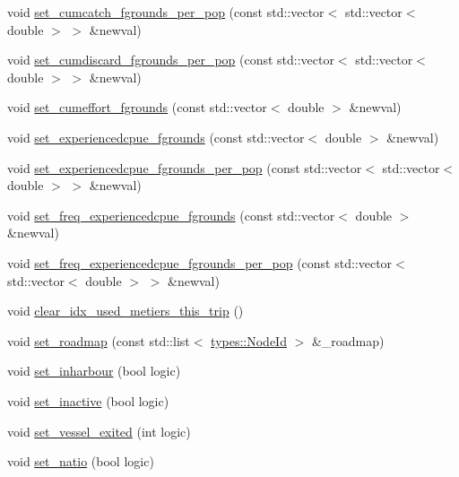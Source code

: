 \begin{DoxyCompactItemize}
\item 
void \mbox{\hyperlink{class_vessel_a8b44f8261d1ca80cc5e86603cd52852a}{set\+\_\+cumcatch\+\_\+fgrounds\+\_\+per\+\_\+pop}} (const std\+::vector$<$ std\+::vector$<$ double $>$ $>$ \&newval)
\item 
void \mbox{\hyperlink{class_vessel_ac49a748160127f353d2cd22e5eb75c2e}{set\+\_\+cumdiscard\+\_\+fgrounds\+\_\+per\+\_\+pop}} (const std\+::vector$<$ std\+::vector$<$ double $>$ $>$ \&newval)
\item 
void \mbox{\hyperlink{class_vessel_af4f1e3170ec6f71aeed23aac07110d65}{set\+\_\+cumeffort\+\_\+fgrounds}} (const std\+::vector$<$ double $>$ \&newval)
\item 
void \mbox{\hyperlink{class_vessel_afa0bdfa0b54d6a9c5e453306a3824230}{set\+\_\+experiencedcpue\+\_\+fgrounds}} (const std\+::vector$<$ double $>$ \&newval)
\item 
void \mbox{\hyperlink{class_vessel_a2fc858f82e610f2b4b4852001ad0c58c}{set\+\_\+experiencedcpue\+\_\+fgrounds\+\_\+per\+\_\+pop}} (const std\+::vector$<$ std\+::vector$<$ double $>$ $>$ \&newval)
\item 
void \mbox{\hyperlink{class_vessel_ab9b55646c702eaa80656d129c6134da1}{set\+\_\+freq\+\_\+experiencedcpue\+\_\+fgrounds}} (const std\+::vector$<$ double $>$ \&newval)
\item 
void \mbox{\hyperlink{class_vessel_a53e54a8e1875755e4cdcaefb5c852b7c}{set\+\_\+freq\+\_\+experiencedcpue\+\_\+fgrounds\+\_\+per\+\_\+pop}} (const std\+::vector$<$ std\+::vector$<$ double $>$ $>$ \&newval)
\item 
void \mbox{\hyperlink{class_vessel_addd52d90f24bff75ed86a0394acdffa8}{clear\+\_\+idx\+\_\+used\+\_\+metiers\+\_\+this\+\_\+trip}} ()
\item 
void \mbox{\hyperlink{class_vessel_aa3e9f5f72c4f36a9f3bee7ce96941e72}{set\+\_\+roadmap}} (const std\+::list$<$ \mbox{\hyperlink{classtypes_1_1_node_id}{types\+::\+Node\+Id}} $>$ \&\+\_\+roadmap)
\item 
void \mbox{\hyperlink{class_vessel_a29fa850ee9a2e0ea92c2dc6c8c2b90c0}{set\+\_\+inharbour}} (bool logic)
\item 
void \mbox{\hyperlink{class_vessel_a9947163ccf008690f425605aa407f453}{set\+\_\+inactive}} (bool logic)
\item 
void \mbox{\hyperlink{class_vessel_a178e908f97c4adcb2f3f4cfd286e9923}{set\+\_\+vessel\+\_\+exited}} (int logic)
\item 
void \mbox{\hyperlink{class_vessel_ae59eb882f03a8833fc73d1afb7eade82}{set\+\_\+natio}} (bool logic)

\end{DoxyCompactItemize}
